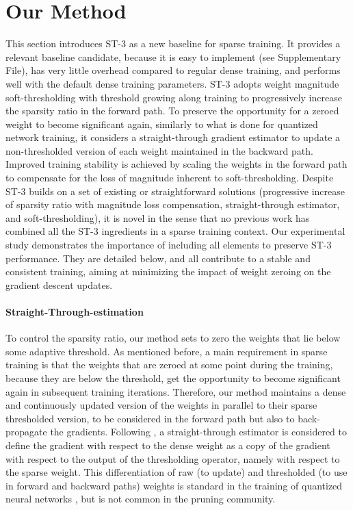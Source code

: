 \documentclass[10pt,twocolumn,letterpaper]{article}
\begin{document}
\section{Our Method}
\label{sec:ours}
This section introduces ST-3 as a new baseline for sparse training. It provides a relevant baseline candidate, because it is easy to implement (see Supplementary File), has very little overhead compared to regular dense training, and performs well with the default dense training parameters. ST-3 adopts weight magnitude soft-thresholding with threshold growing along training to progressively increase the sparsity ratio in the forward path. To preserve the opportunity for a zeroed weight to become significant again, similarly to what is done for quantized network training, it considers a straight-through gradient estimator to update a non-thresholded version of each weight maintained in the backward path. Improved training stability is achieved by scaling the weights in the forward path to compensate for the loss of magnitude inherent to soft-thresholding. Despite ST-3 builds on a set of existing or straightforward solutions (progressive increase of sparsity ratio with magnitude loss compensation, straight-through estimator, and soft-thresholding), it is novel in the sense that no previous work has combined all the ST-3 ingredients in a sparse training context. Our experimental study demonstrates the importance of including all elements to preserve ST-3 performance. They are detailed below, and all contribute to a stable and consistent training, aiming at minimizing the impact of weight zeroing on the gradient descent updates.


\paragraph{Straight-Through-estimation}
To control the sparsity ratio, our method sets to zero the weights that lie below some adaptive threshold. As mentioned before, a main requirement in sparse training is that the weights that are zeroed at some point during the training, because they are below the threshold, get the opportunity to become significant again in subsequent training iterations. Therefore, our method maintains a dense and continuously updated version of the weights in parallel to their sparse thresholded version, to be considered in the forward path but also to back-propagate the gradients. 
Following \cite{Bengio13,Penghang2019}, a straight-through estimator is considered to define the gradient with respect to the dense weight as a copy of the gradient with respect to the output of the thresholding operator, namely with respect to the sparse weight.
This differentiation of raw (to update) and thresholded (to use in forward and backward paths) weights is standard in the training of quantized neural networks \cite{Hubara2016,Mellempudi2017}, but is not common in the pruning community.
\end{document}
